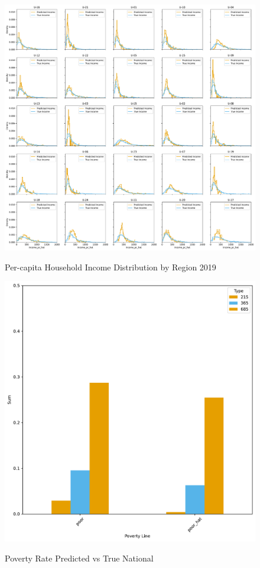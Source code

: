 \begin{figure}[H]
    \centering
    \caption{Per-capita Household Income Distribution by Region 2019}
    \includegraphics[width=\textwidth]{../figures/fig2_prediction_vs_true_income_by_region_lasso_training_weighted.pdf}
    \label{fig:enter-label}
\end{figure}


\begin{figure}[H]
    \centering
    \caption{Poverty Rate Predicted vs True National}
    \includegraphics[width=\textwidth]{../figures/fig3_prediction_vs_true_poverty_rate_national.pdf}
    \label{fig:enter-label}
\end{figure}


